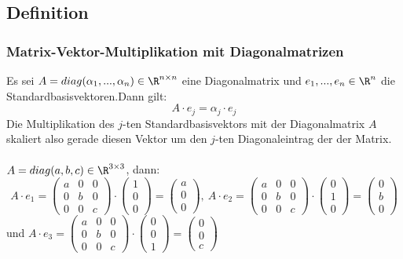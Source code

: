 \subsection{Definition}
%
\begin{frame}\frametitle{Matrix-Vektor-Multiplikation mit Diagonalmatrizen}
Es sei $A=diag(\alpha_1,...,\alpha_n)\in \R^{n\times n}$ eine Diagonalmatrix und $e_1,...,e_n \in \R^n$ die Standardbasisvektoren.\pause Dann gilt:
$$
A\cdot e_j= \alpha_j \cdot e_j
$$\pause
Die Multiplikation des $j$-ten Standardbasisvektors mit der Diagonalmatrix $A$ skaliert also gerade diesen Vektor um den $j$-ten Diagonaleintrag der der Matrix.\\\vfill\pause
{}\\
$A=diag(a,b,c) \in \R^{3 \times 3}$, dann:
\small$$
A\cdot e_1 = \begin{pmatrix} a & 0&0 \\ 0&b&0 \\ 0&0&c \end{pmatrix}\cdot \begin{pmatrix} 1 \\ 0 \\ 0 \end{pmatrix}=\begin{pmatrix} a \\ 0 \\ 0 \end{pmatrix}, \ 
A\cdot e_2 = \begin{pmatrix} a & 0&0 \\ 0&b&0 \\ 0&0&c \end{pmatrix}\cdot \begin{pmatrix} 0 \\ 1 \\ 0 \end{pmatrix}=\begin{pmatrix} 0 \\ b \\ 0 \end{pmatrix}$$
und
$A\cdot e_3 = \begin{pmatrix} a & 0&0 \\ 0&b&0 \\ 0&0&c \end{pmatrix}\cdot \begin{pmatrix} 0 \\ 0 \\ 1 \end{pmatrix}=\begin{pmatrix} 0 \\ 0 \\ c \end{pmatrix}
$
\end{frame}

